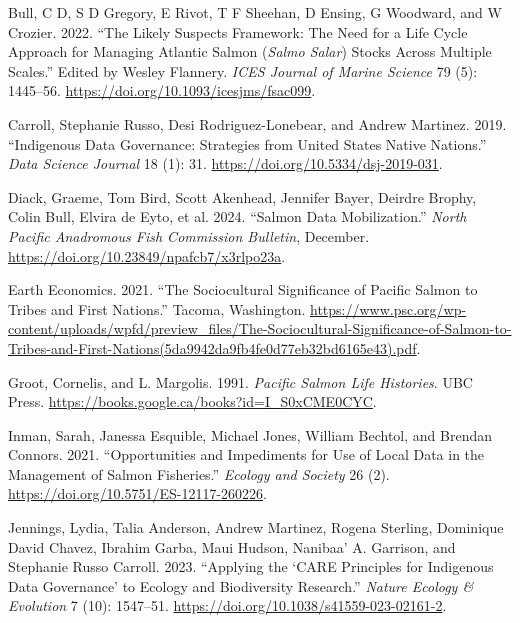 \documentclass[
  letterpaper,
  DIV=11,
  numbers=noendperiod]{scrartcl}
\newlength{\cslhangindent}
\newenvironment{CSLReferences}[2] %
 {\begin{list}{}{%
  \setlength{\itemindent}{0pt}
  \setlength{\leftmargin}{0pt}
  \setlength{\parsep}{0pt}
  \ifodd #1
   \setlength{\leftmargin}{\cslhangindent}
   \setlength{\itemindent}{-1\cslhangindent}
  \fi
  \setlength{\itemsep}{#2\baselineskip}}}
 {\end{list}}
\begin{document}
\label{refs}
\begin{CSLReferences}{1}{0}
Bull, C D, S D Gregory, E Rivot, T F Sheehan, D Ensing, G Woodward, and
W Crozier. 2022. {``The Likely Suspects Framework: The Need for a Life
Cycle Approach for Managing Atlantic Salmon ({\emph{Salmo Salar}})
Stocks Across Multiple Scales.''} Edited by Wesley Flannery. \emph{ICES
Journal of Marine Science} 79 (5): 1445--56.
\url{https://doi.org/10.1093/icesjms/fsac099}.

Carroll, Stephanie Russo, Desi Rodriguez-Lonebear, and Andrew Martinez.
2019. {``Indigenous Data Governance: Strategies from United States
Native Nations.''} \emph{Data Science Journal} 18 (1): 31.
\url{https://doi.org/10.5334/dsj-2019-031}.

Diack, Graeme, Tom Bird, Scott Akenhead, Jennifer Bayer, Deirdre Brophy,
Colin Bull, Elvira de Eyto, et al. 2024. {``Salmon Data Mobilization.''}
\emph{North Pacific Anadromous Fish Commission Bulletin}, December.
\url{https://doi.org/10.23849/npafcb7/x3rlpo23a}.

Earth Economics. 2021. {``The Sociocultural Significance of Pacific
Salmon to Tribes and First Nations.''} Tacoma, Washington.
\url{https://www.psc.org/wp-content/uploads/wpfd/preview_files/The-Sociocultural-Significance-of-Salmon-to-Tribes-and-First-Nations(5da9942da9fb4fe0d77eb32bd6165e43).pdf}.

Groot, Cornelis, and L. Margolis. 1991. \emph{Pacific Salmon Life
Histories}. UBC Press.
\url{https://books.google.ca/books?id=I_S0xCME0CYC}.

Inman, Sarah, Janessa Esquible, Michael Jones, William Bechtol, and
Brendan Connors. 2021. {``Opportunities and Impediments for Use of Local
Data in the Management of Salmon Fisheries.''} \emph{Ecology and
Society} 26 (2). \url{https://doi.org/10.5751/ES-12117-260226}.

Jennings, Lydia, Talia Anderson, Andrew Martinez, Rogena Sterling,
Dominique David Chavez, Ibrahim Garba, Maui Hudson, Nanibaa' A.
Garrison, and Stephanie Russo Carroll. 2023. {``Applying the {`}CARE
Principles for Indigenous Data Governance{'} to Ecology and Biodiversity
Research.''} \emph{Nature Ecology \& Evolution} 7 (10): 1547--51.
\url{https://doi.org/10.1038/s41559-023-02161-2}.


\end{CSLReferences}
\end{document}
